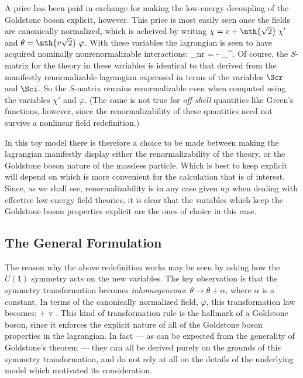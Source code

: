 \documentclass[12pt]{report}
\begin{document}
A price has been paid in exchange for making the low-energy
decoupling of the Goldstone boson explicit, however. This
price is most easily seen once the fields are canonically
normalized, which is acheived by writing $\chi = v +
\nth{\sqrt{2}} \; \chi'$ and 
$\theta = \nth{v \sqrt{2}} \; \varphi$. With these
variables the lagrangian is seen to have acquired nominally
nonrenormalizable interactions:
%
\eq
\label{nrints}
\Scl_{\rm nr} = -  \; \partial_\mu \varphi \partial^\mu \varphi. \eeq
%
Of course, the $S$-matrix for the theory in these variables
is identical to that derived from the manifestly
renormalizable lagrangian expressed in terms of the
variables $\Scr$ and $\Sci$. So the $S$-matrix remains
renormalizable even when computed using the variables
$\chi'$ and $\varphi$. (The same is not true for {\em
off-shell} quantities like Green's functions, however,
since the renormalizability of these quantities need not
survive a nonlinear field redefinition.)

In this toy model there is therefore a choice to be made
between making the lagrangian manifestly display either the
renormalizability of the theory, or the Goldstone boson
nature of the massless particle. Which is best to keep
explicit will depend on which is more convenient for the
calculation that is of interest. Since, as we shall see,
renormalizability is in any case given up when dealing with
effective low-energy field theories, it is clear that the
variables which keep the Goldstone boson properties
explicit are the ones of choice in this case.

\subsection{The General Formulation}

The reason why the above redefinition works may be seen by
asking how the $U(1)$ symmetry acts on the new variables.
The key observation is that the symmetry  transformation
becomes 
{\em inhomogeneous}: $\theta \to \theta + \alpha$, where 
$\alpha$ is a constant. In terms of the canonically
normalized field, $\varphi$, this transformation law
becomes:
%
\eq
\label{gbabeltransf}
\varphi \to \varphi +  \; v \; \alpha. \eeq
%
This kind of transformation rule is the hallmark of a
Goldstone boson, since it enforces the explicit nature of
all of the Goldstone boson properties in the lagrangian. In
fact --- as can be expected from the generality of
Goldstone's theorem --- they can all be derived purely on
the grounds of this symmetry transformation, and do not
rely at all on the details of the underlying model which
motivated its consideration.
\end{document}
